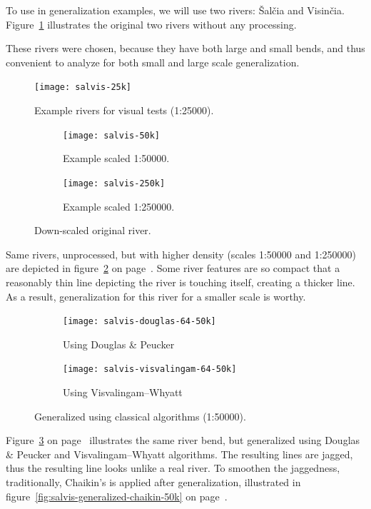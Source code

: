 \documentclass[a4paper]{article}
\newcommand{\onpage}[1]{\ref{#1} on page~\pageref{#1}}
\newcommand{\DP}{Douglas \& Peucker}
\newcommand{\VW}{Visvalingam--Whyatt}
\begin{document}
To use in generalization examples, we will use two rivers: Šalčia and Visinčia.
Figure~\ref{fig:salvis-25} illustrates the original two rivers without any
processing.

These rivers were chosen, because they have both large and small bends, and
thus convenient to analyze for both small and large scale generalization.

\begin{figure}[h]
    \centering
    \texttt{[image: salvis-25k]}
    \caption{Example rivers for visual tests (1:25000).}
    \label{fig:salvis-25}
\end{figure}

\begin{figure}[h]
    \centering
    \begin{subfigure}[b]{.49\textwidth}
        \texttt{[image: salvis-50k]}
        \caption{Example scaled 1:50000.}
    \end{subfigure}
    \hfill
    \begin{subfigure}[b]{.49\textwidth}
        \centering
        \texttt{[image: salvis-250k]}
        \caption{Example scaled 1:250000.}
    \end{subfigure}
    \caption{Down-scaled original river.}
    \label{fig:salvis-50-250}
\end{figure}

Same rivers, unprocessed, but with higher density (scales 1:50000 and 1:250000)
are depicted in figure~\onpage{fig:salvis-50-250}. Some river features are so
compact that a reasonably thin line depicting the river is touching itself,
creating a thicker line. As a result, generalization for this river for a
smaller scale is worthy.

\begin{figure}[h]
    \centering
    \begin{subfigure}[b]{.49\textwidth}
        \texttt{[image: salvis-douglas-64-50k]}
        \caption{Using {\DP}}
    \end{subfigure}
    \hfill
    \begin{subfigure}[b]{.49\textwidth}
        \texttt{[image: salvis-visvalingam-64-50k]}
        \caption{Using {\VW}}
    \end{subfigure}
    \caption{Generalized using classical algorithms (1:50000).}
    \label{fig:salvis-generalized-50k}
\end{figure}

Figure~\onpage{fig:salvis-generalized-50k} illustrates the same river bend, but
generalized using {\DP} and {\VW} algorithms. The resulting lines are jagged,
thus the resulting line looks unlike a real river. To smoothen the jaggedness,
traditionally, Chaikin's\cite{chaikin1974algorithm} is applied after
generalization, illustrated in
figure~\onpage{fig:salvis-generalized-chaikin-50k}.
\end{document}
